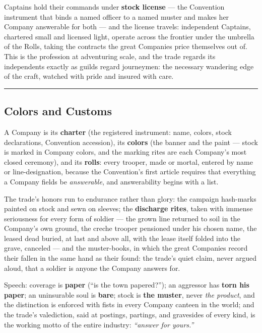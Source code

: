 Captains hold their commands under \textbf{stock license} --- the Convention instrument that binds a named officer to a named muster and makes her Company answerable for both --- and the license travels: independent Captains, chartered small and licensed light, operate across the frontier under the umbrella of the Rolls, taking the contracts the great Companies price themselves out of. This is the profession at adventuring scale, and the trade regards its independents exactly as guilds regard journeymen: the necessary wandering edge of the craft, watched with pride and insured with care.

\medskip\hrule\medskip

\subsection{Colors and Customs}

A Company is its \textbf{charter} (the registered instrument: name, colors, stock declarations, Convention accession), its \textbf{colors} (the banner and the paint --- stock is marked in Company colors, and the marking rites are each Company's most closed ceremony), and its \textbf{rolls}: every trooper, made or mortal, entered by name or line-designation, because the Convention's first article requires that everything a Company fields be \textit{answerable}, and answerability begins with a list.

The trade's honors run to endurance rather than glory: the campaign hash-marks painted on stock and sewn on sleeves; the \textbf{discharge rites}, taken with immense seriousness for every form of soldier --- the grown line returned to soil in the Company's own ground, the creche trooper pensioned under his chosen name, the leased dead buried, at last and above all, with the lease itself folded into the grave, canceled --- and the muster-books, in which the great Companies record their fallen in the same hand as their found: the trade's quiet claim, never argued aloud, that a soldier is anyone the Company answers for.

Speech: coverage is \textbf{paper} (``is the town papered?''); an aggressor has \textbf{torn his paper}; an uninsurable soul is \textbf{bare}; stock is \textbf{the muster}, never \textit{the product}, and the distinction is enforced with fists in every Company canteen in the world; and the trade's valediction, said at postings, partings, and gravesides of every kind, is the working motto of the entire industry: \textit{``answer for yours.''}

